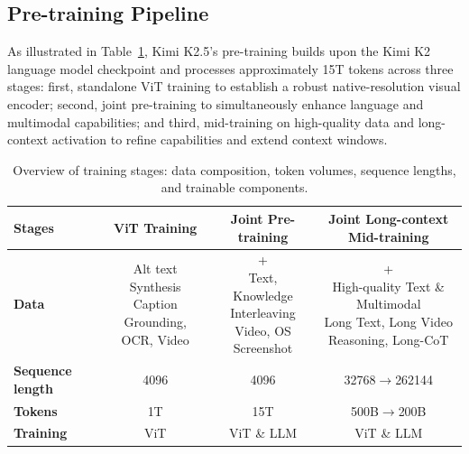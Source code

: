 \documentclass{article}
\begin{document}
\subsection{Pre-training Pipeline}

As illustrated in Table~\ref{tab:pretrainingdatavolume}, Kimi K2.5's pre-training builds upon the Kimi K2 language model checkpoint and processes approximately 15T tokens across three stages: first, standalone ViT training to establish a robust native-resolution visual encoder; second, joint pre-training to simultaneously enhance language and multimodal capabilities; and third, mid-training on high-quality data and long-context activation to refine capabilities and extend context windows.

\begin{table}[t]
\centering
\caption{Overview of training stages: data composition, token volumes, sequence lengths, and trainable components.}
\vspace{0.3em}
\renewcommand{\arraystretch}{1.2} 
\begin{tabular}{lccc}
\toprule
\textbf{Stages} & \textbf{ViT Training} & \textbf{Joint Pre-training} & \textbf{Joint Long-context Mid-training} \\
\midrule
\textbf{Data} & 
\makecell[c]{Alt text \\ Synthesis Caption \\ Grounding, OCR, Video} & 
\makecell[c]{+ \\ Text, Knowledge \\ Interleaving \\ Video, OS Screenshot} & 
\makecell[c]{+ \\ High-quality Text \& Multimodal \\ Long Text, Long Video \\ Reasoning, Long-CoT } \\ 
\midrule
\textbf{Sequence length} & 4096 & 4096 & 32768$\rightarrow$262144 \\
\midrule
\textbf{Tokens} & 1T & 15T & 500B$\rightarrow$200B \\
\midrule
\textbf{Training} & ViT & ViT \& LLM & ViT \& LLM \\
\bottomrule
\end{tabular}
\label{tab:pretrainingdatavolume}
\end{table}
\end{document}
